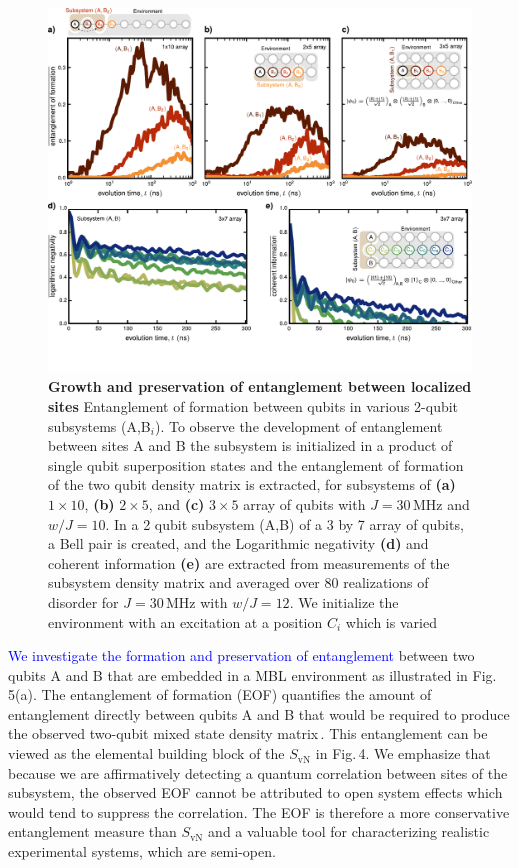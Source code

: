 \begin{figure}[t] %
\includegraphics[width=160mm]{./PDF/fig_5.pdf}
\vspace{-4.5em}
\caption{\small \textbf{Growth and preservation of entanglement between localized sites}
Entanglement of formation between qubits in various 2-qubit subsystems (A,B$_i$). To observe the development of entanglement between sites A and B the subsystem is initialized in a product of single qubit superposition states and the entanglement of formation of the two qubit density matrix is extracted, for subsystems of \textbf{(a)} $1\times10$, \textbf{(b)} $2\times5$, and \textbf{(c)} $3\times5$ array of qubits with $J=30$\,MHz and $w/J=10$. In a 2 qubit subsystem (A,B) of a 3 by 7 array of qubits, a Bell pair is created, and the Logarithmic negativity \textbf{(d)} and coherent information \textbf{(e)} are extracted from measurements of the subsystem density matrix and averaged over 80 realizations of disorder for $J=30$\,MHz with $w/J=12$.  We initialize the environment with an excitation at a position $C_i$ which is varied}
\end{figure}



\textcolor{blue}{We investigate the formation and preservation of entanglement} between two qubits A and B that are embedded in a MBL environment as illustrated in Fig.\,5(a). The entanglement of formation (EOF) quantifies the amount of entanglement directly between qubits A and B that would be required to produce the observed two-qubit mixed state density matrix\,\cite{Wootters1998}.   This entanglement can be viewed as the elemental building block of the $S_{\text{vN}}$ in Fig.\,4. We emphasize that because we are affirmatively detecting a quantum correlation between sites of the subsystem, the observed EOF cannot be attributed to open system effects which would tend to suppress the correlation.  The EOF is therefore a more conservative entanglement measure than $S_{\text{vN}}$ and a valuable tool for characterizing realistic experimental systems, which are semi-open.

